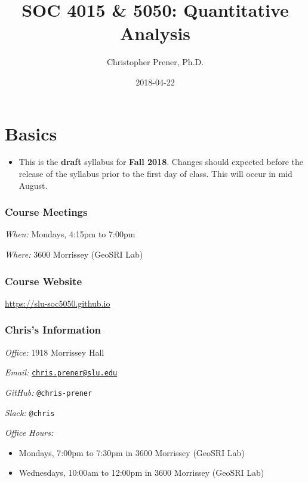 \documentclass[]{book}
\title{SOC 4015 \& 5050: Quantitative Analysis}
\author{Christopher Prener, Ph.D.}
\date{2018-04-22}
\newenvironment{rmdblock}[1]
  {\begin{shaded*}
  \begin{itemize}
  \renewcommand{\labelitemi}{
    \raisebox{-.7\height}[0pt][0pt]{
      {\setkeys{Gin}{width=3em,keepaspectratio}\texttt{[image: images/\#1]}}
    }
  }
  \item
  }
  {
  \end{itemize}
  \end{shaded*}
  }
\newenvironment{rmdwarning}
  {\begin{rmdblock}{warning}}
  {\end{rmdblock}}
\theoremstyle{definition}
\theoremstyle{definition}
\theoremstyle{definition}
\theoremstyle{remark}
\begin{document}
\maketitle

{
\setcounter{tocdepth}{1}
\tableofcontents
}
\chapter*{Basics}\label{basics}

\begin{rmdwarning}
This is the \textbf{draft} syllabus for \textbf{Fall 2018}. Changes
should expected before the release of the syllabus prior to the first
day of class. This will occur in mid August.
\end{rmdwarning}

\subsection*{Course Meetings}\label{course-meetings}

\emph{When:} Mondays, 4:15pm to 7:00pm

\emph{Where:} 3600 Morrissey (GeoSRI Lab)

\subsection*{Course Website}\label{course-website}

\url{https://slu-soc5050.github.io}

\subsection*{Chris's Information}\label{chriss-information}

\emph{Office:} 1918 Morrissey Hall

\emph{Email:}
\href{mailto:chris.prener@slu.edu}{\nolinkurl{chris.prener@slu.edu}}

\emph{GitHub:} \texttt{@chris-prener}

\emph{Slack:} \texttt{@chris}

\emph{Office Hours:}

\begin{itemize}
\item
  Mondays, 7:00pm to 7:30pm in 3600 Morrissey (GeoSRI Lab)
\item
  Wednesdays, 10:00am to 12:00pm in 3600 Morrissey (GeoSRI Lab)
\end{itemize}
\end{document}
